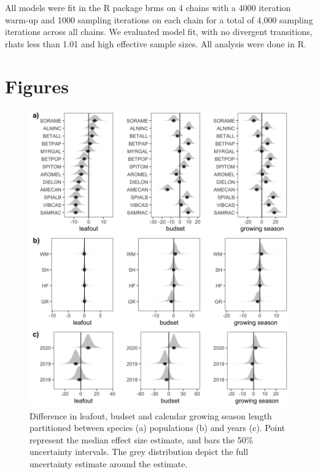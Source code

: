 \documentclass{article}[12pt]
\begin{document}
All models were fit in the R package brms on 4 chains with a 4000 iteration warm-up and 1000 sampling iterations on each chain for a total of 4,000 sampling iterations across all chains. We evaluated model fit, with no divergent transitions, rhats less than 1.01 and high effective sample sizes. All analysis were done in R.


\section{Figures} %

\begin{figure}[h!]
    \centering
 \includegraphics[width=.7\textwidth]{..//analyses/figures/var_parts.jpeg}
    \caption{Difference in leafout, budset and calendar growing season length partitioned between species (a) populations (b) and years (c). Point represent the median effect size estimate, and bars the 50\% uncertainty intervals. The grey distribution depict the full uncertainty estimate around the estimate.}
    \label{fig:vapar}
\end{figure}
\end{document}
